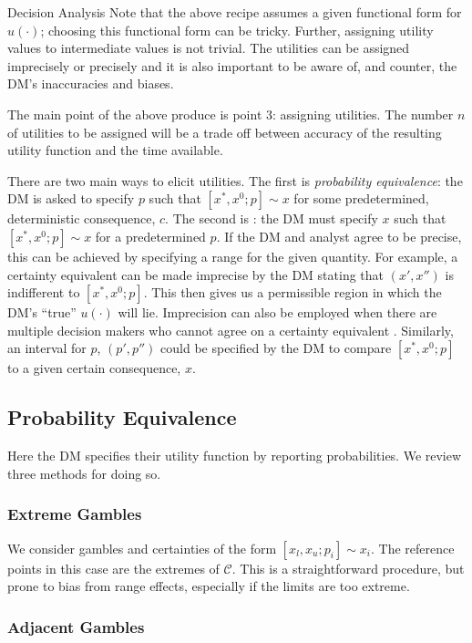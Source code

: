 \begin{chapter}{Decision Analysis \label{Ch:decision}}
Note that the above recipe assumes a given functional form for $u(\cdot)$; choosing this functional form can be tricky. Further, assigning utility values to intermediate values is not trivial. The utilities can be assigned imprecisely or precisely and it is also important to be aware of, and counter, the DM's inaccuracies and biases.

The main point of the above produce is point $3$: assigning utilities. The number $n$ of utilities to be assigned will be a trade off between accuracy of the resulting utility function and the time available.

There are two main ways to elicit utilities. The first is \textit{probability equivalence}: the DM is asked to specify $p$ such that $[x^*, x^0; p] \sim x$ for some predetermined, deterministic consequence, $c$. The second is : the DM must specify $x$ such that $[x^*, x^0; p] \sim x$ for a predetermined $p$. If the DM and analyst agree to be precise, this can be achieved by specifying a range for the given quantity. For example, a certainty equivalent can be made imprecise by the DM stating that $(x', x'')$ is indifferent to  $[x^*, x^0; p]$. This then gives us a permissible region in which the DM's ``true'' $u(\cdot)$ will lie. Imprecision can also be employed when there are multiple decision makers who cannot agree on a certainty equivalent \citep{Farrow2009, Farrow2010}. Similarly, an interval for $p$, $(p' ,p'')$ could be specified by the DM to compare $[x^*, x^0; p]$ to a given certain consequence, $x$. 

\subsection*{Probability Equivalence}

Here the DM specifies their utility function by reporting probabilities. We review three methods for doing so.

\subsubsection*{Extreme Gambles}

We consider gambles and certainties of the form $[x_l, x_u; p_i]\sim x_i$. The reference points in this case are the extremes of $\mathcal{C}$. This is a straightforward procedure, but prone to bias from range effects, especially if the limits are too extreme.

\subsubsection*{Adjacent Gambles}


\end{chapter}
